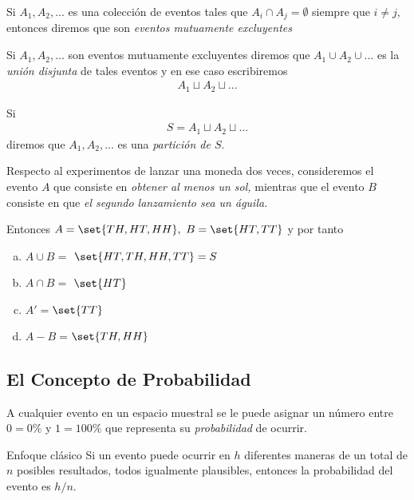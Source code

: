  \begin{defn}
  Si $A_{1},A_{2},...$ es una colección de eventos tales que $A_{i}\cap A_{j}=\emptyset$ siempre que $i\neq j,$ entonces diremos que son \emph{eventos mutuamente excluyentes}
 \end{defn}

 


 \begin{defn}
  Si $A_{1}, A_{2}, ...$ son eventos mutuamente excluyentes diremos que $A_{1} \cup A_{2} \cup ... $ es la \emph{unión disjunta} de tales eventos y en ese caso escribiremos
  \begin{align*}
A_{1}\sqcup A_{2} \sqcup ...
\end{align*}
 \end{defn}


Si \begin{align*}
S=A_{1}\sqcup A_{2} \sqcup ...
\end{align*}
diremos que $A_{1},A_{2},...$ es una \emph{partición de $S.$}


 \begin{exmp}
  \label{exmp:1.9}
  Respecto al experimentos de lanzar una moneda dos veces, consideremos el evento $A$ que consiste en \emph{obtener al menos un sol,}  mientras que el evento $B$ consiste en que \emph{el segundo lanzamiento sea un águila.}

  Entonces $A=\set{TH,HT,HH},$ $B=\set{HT,TT}$ y por tanto 
  \begin{enumerate}[(a)]
   \item $A\cup B =$ $\set{HT,TH,HH,TT}= S$ 
	\item $A\cap B =$ $\set{HT}$ 
	\item $A'=$$\set{TT}$
	\item $A-B=$$\set{TH,HH}$
  \end{enumerate}

 \end{exmp}


\subsection{El Concepto de Probabilidad}
{}
A cualquier evento en un espacio muestral se le puede asignar un número entre $0=0\%$ y $1=100\%$ que representa su \emph{probabilidad} de ocurrir.

{Enfoque clásico}
Si un evento puede ocurrir en $h$ diferentes maneras de un total de $n$ posibles resultados, todos igualmente plausibles, entonces la probabilidad del evento es $h/n.$


